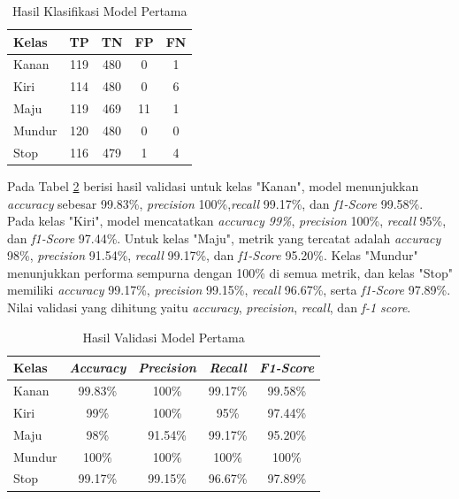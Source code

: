 \begin{longtable}{|l|c|c|c|c|}
  \caption{Hasil Klasifikasi Model Pertama}
  \label{tb:cm_model1} \\
  \hline
  \rowcolor[HTML]{C0C0C0} 
  \textbf{Kelas} & \textbf{TP} & \textbf{TN} & \textbf{FP} & \textbf{FN} \\ \hline
  Kanan    & 119          & 480         & 0           & 1           \\ \hline
  Kiri      & 114          & 480         & 0           & 6           \\ \hline
  Maju      & 119          & 469         & 11           & 1           \\ \hline
  Mundur     & 120          & 480         & 0           & 0           \\ \hline
  Stop  & 116          & 479         & 1           & 4           \\ \hline
\end{longtable}

Pada Tabel \ref{tb:vs_model1} berisi hasil validasi untuk kelas "Kanan", model menunjukkan \emph{accuracy} sebesar 99.83\%, \emph{precision} 100\%,\emph{recall} 99.17\%, dan \emph{f1-Score} 99.58\%. Pada kelas "Kiri", model mencatatkan \emph{accuracy 99\%}, \emph{precision} 100\%, \emph{recall} 95\%, dan \emph{f1-Score} 97.44\%. Untuk kelas "Maju", metrik yang tercatat adalah \emph{accuracy} 98\%, \emph{precision} 91.54\%, \emph{recall} 99.17\%, dan \emph{f1-Score} 95.20\%. Kelas "Mundur" menunjukkan performa sempurna dengan 100\% di semua metrik, dan kelas "Stop" memiliki \emph{accuracy} 99.17\%, \emph{precision} 99.15\%, \emph{recall} 96.67\%, serta \emph{f1-Score} 97.89\%. Nilai validasi yang dihitung yaitu \emph{accuracy}, \emph{precision}, \emph{recall}, dan \emph{f-1 score}. 

\begin{longtable}{|l|c|c|c|c|}
  \caption{Hasil Validasi Model Pertama}
  \label{tb:vs_model1} \\
  \hline
  \rowcolor[HTML]{C0C0C0} 
  \textbf{Kelas} & \textbf{\emph{Accuracy}} & \textbf{\emph{Precision}} & \textbf{\emph{Recall}} & \textbf{\emph{F1-Score}} \\ \hline
  Kanan    & 99.83\%            & 100\%             & 99.17\%           & 99.58\%            \\ \hline
  Kiri     & 99\%          & 100\%           & 95\%           & 97.44\%           \\ \hline
  Maju      & 98\%          & 91.54\%           & 99.17\%          & 95.20\%          \\ \hline
  Mundur     & 100\%            & 100\%             & 100\%           & 100\%            \\ \hline
  Stop  & 99.17\%            & 99.15\%             & 96.67\%           & 97.89\%            \\ \hline
\end{longtable}

